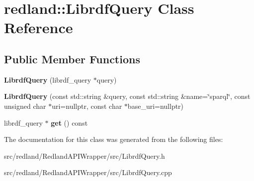 \hypertarget{classredland_1_1LibrdfQuery}{}\section{redland\+:\+:Librdf\+Query Class Reference}
\label{classredland_1_1LibrdfQuery}
\subsection*{Public Member Functions}
\begin{DoxyCompactItemize}
\item 
\mbox{\label{classredland_1_1LibrdfQuery_aacca5302206092fbd8908934d2236021}} 
{\bfseries Librdf\+Query} (librdf\+\_\+query $\ast$query)
\item 
\mbox{\label{classredland_1_1LibrdfQuery_a63a49930cc3c54938203683eab2c96fb}} 
{\bfseries Librdf\+Query} (const std\+::string \&query, const std\+::string \&name=\char`\"{}sparql\char`\"{}, const unsigned char $\ast$uri=nullptr, const char $\ast$base\+\_\+uri=nullptr)
\item 
\mbox{\label{classredland_1_1LibrdfQuery_a0302f24051ae2050bc2e802a59364554}} 
librdf\+\_\+query $\ast$ {\bfseries get} () const
\end{DoxyCompactItemize}


The documentation for this class was generated from the following files\+:\begin{DoxyCompactItemize}
\item 
src/redland/\+Redland\+A\+P\+I\+Wrapper/src/Librdf\+Query.\+h\item 
src/redland/\+Redland\+A\+P\+I\+Wrapper/src/Librdf\+Query.\+cpp\end{DoxyCompactItemize}
